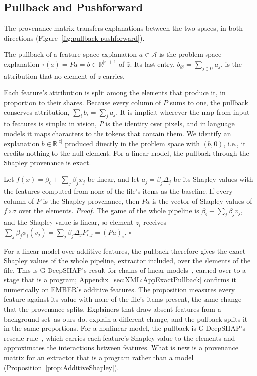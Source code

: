 \subsection{Pullback and Pushforward}
\label{sec:XML:Transfers}

The provenance matrix transfers explanations between the two spaces, in both directions
(Figure~\ref{fig:pullback-pushforward}).

\label{def:Pullback}
{
The pullback of a feature-space explanation $a \in \mathcal{A}$ is the problem-space explanation
$\tau(a) = Pa = b \in \mathbb{R}^{|z| + 1}$ of $\bar{z}$. Its last entry, $b_\varnothing = \sum_{j \in U} a_j$, is the
attribution that no element of $z$ carries.
}

Each feature's attribution is split among the elements that produce it, in proportion to their shares. Because every
column of $P$ sums to one, the pullback conserves attribution, $\sum_i b_i = \sum_j a_j$. It is implicit wherever the
map from input to features is simple: in vision, $P$ is the identity over pixels, and in language models it maps
characters to the tokens that contain them. We identify an explanation $b \in \mathbb{R}^{|z|}$ produced directly in the
problem space with $(b, 0)$, i.e., it credits nothing to the null element. For a linear model, the pullback through the
Shapley provenance is exact.

\label{prop:PullbackExact}
{
Let $f(x) = \beta_0 + \sum_j \beta_j x_j$ be linear, and let $a_j = \beta_j \Delta_j$ be its Shapley values with the
features computed from none of the file's items as the baseline. If every column of $P$ is the Shapley provenance, then $Pa$ is the
vector of Shapley values of $f \circ \sigma$ over the elements.
\textit{Proof.} The game of the whole pipeline is $\beta_0 + \sum_j \beta_j v_j$, and the Shapley value is linear, so
element $z_i$ receives $\sum_j \beta_j \phi_i(v_j) = \sum_j \beta_j \Delta_j P^\star_{i,j} = (Pa)_i$. \hfill$\square$
}

For a linear model over additive features, the pullback therefore gives the exact Shapley values of the whole
pipeline, extractor included, over the elements of the file. This is G-DeepSHAP's result for chains of linear
models~\cite{chen2022explaining}, carried over to a stage that is a program; Appendix~\ref{sec:XML:AppExactPullback}
confirms it numerically on EMBER's additive features. The proposition measures every feature
against its value with none of the file's items present, the same change that the provenance splits. Explainers that
draw absent features from a background set, as ours do, explain a different change, and the pullback splits it in the
same proportions. For a nonlinear model, the pullback is G-DeepSHAP's rescale rule~\cite{shrikumar2017learning,
chen2022explaining}, which carries each feature's Shapley value to the elements and approximates the interactions
between features. What is new is a provenance matrix for an
extractor that is a program rather than a model (Proposition~\ref{prop:AdditiveShapley}).

